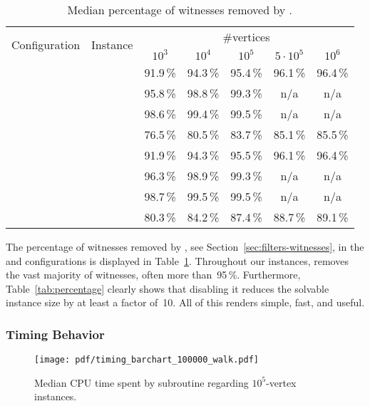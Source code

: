 \begin{table}
	\centering
	\small
	\begin{tabular}{|l|l|ccccc|}
		\hline
		\multirow{2}{*}{Configuration} & \multirow{2}{*}{Instance} & \multicolumn{5}{|c|}{\#vertices} \\
		& & $10^3$ & $10^4$ & $10^5$ & $5 \cdot 10^5$ & $10^6$ \\
		\hline
		\hline
		\multirow{4}{*}{\vdefault}
			& \walk           & 91.9\,\% & 94.3\,\% & 95.4\,\% & 96.1\,\% & 96.4\,\% \\
			& \sinewalk       & 95.8\,\% & 98.8\,\% & 99.3\,\% &      n/a &      n/a \\
			& \parabolawalk   & 98.6\,\% & 99.4\,\% & 99.5\,\% &      n/a &      n/a \\
			& \concavevalleys & 76.5\,\% & 80.5\,\% & 83.7\,\% & 85.1\,\% & 85.5\,\% \\
		\hline
		\hline
		\multirow{4}{*}{\pdefault}
			& \walk           & 91.9\,\% & 94.3\,\% & 95.5\,\% & 96.1\,\% & 96.4\,\% \\
			& \sinewalk       & 96.3\,\% & 98.9\,\% & 99.3\,\% &      n/a &      n/a \\
			& \parabolawalk   & 98.7\,\% & 99.5\,\% & 99.5\,\% &      n/a &      n/a \\
			& \concavevalleys & 80.3\,\% & 84.2\,\% & 87.4\,\% & 88.7\,\% & 89.1\,\% \\
		\hline
	\end{tabular}
	\caption{Median percentage of witnesses removed by \witnessfilter.}
	\label{tab:witnessfilter}
\end{table}

The percentage of witnesses removed by \witnessfilter, see Section~\ref{sec:filters-witnesses}, in the \vdefault and \pdefault configurations is displayed in Table~\ref{tab:witnessfilter}.
Throughout our instances, \witnessfilter removes the vast majority of witnesses, often more than~95\,\%.
Furthermore, Table~\ref{tab:percentage} clearly shows that disabling it reduces the solvable instance size by at least a factor of~10.
All of this renders \witnessfilter simple, fast, and useful.

\subsubsection{Timing Behavior}
\label{sec:experiments-time}

\begin{figure}
	\centering
	\texttt{[image: pdf/timing\_barchart\_100000\_walk.pdf]}
	\caption{Median CPU time spent by subroutine regarding $10^5$-vertex \walk instances.}
	\label{fig:time-bar}
\end{figure}

